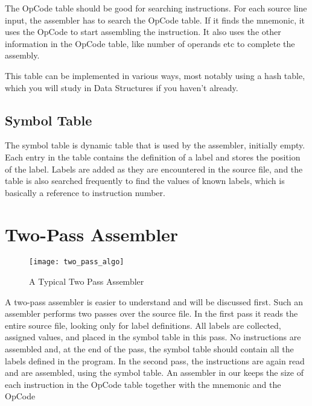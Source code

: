 The OpCode table should be good for searching instructions. For each source line input, the assembler has to search the OpCode table. If it finds the mnemonic, it uses the OpCode to start assembling the instruction. It also uses the other information in the OpCode table, like number of operands etc to complete the assembly.

This table can be implemented in various ways, most notably using a hash table, which you will study in Data Structures if you haven't already.

\subsection{Symbol Table}

The symbol table is dynamic table that is used by the assembler, initially empty. Each entry in the table contains the definition of a label and stores the position of the label. Labels are added as they are encountered in the source file, and the table is also searched frequently to find the values of known labels, which is basically a reference to instruction number.

\newpage

\section{Two-Pass Assembler}

\begin{figure}[h]
\caption{A Typical Two Pass Assembler}
\label{fig:twopass}
\centering
\texttt{[image: two\_pass\_algo]}
\end{figure}

A two-pass assembler is easier to understand and will be discussed first. Such
an assembler performs two passes over the source file. In the first pass it reads the
entire source file, looking only for label definitions. All labels are collected, assigned
values, and placed in the symbol table in this pass. No instructions are assembled
and, at the end of the pass, the symbol table should contain all the labels defined in
the program. In the second pass, the instructions are again read and are assembled,
using the symbol table. An assembler in our keeps
the size of each instruction in the OpCode table together with the mnemonic and
the OpCode
